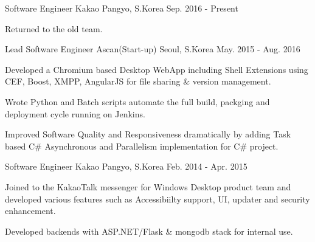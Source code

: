 

\begin{cventries}

  \cventry
    {Software Engineer} %
    {Kakao} %
    {Pangyo, S.Korea} %
    {Sep. 2016 - Present} %
    {
      \begin{cvitems} %
        \item {Returned to the old team. }
      \end{cvitems}
    }


  \cventry
    {Lead Software Engineer} %
    {Ascan(Start-up)} %
    {Seoul, S.Korea} %
    {May. 2015 - Aug. 2016} %
    {
      \begin{cvitems} %
        \item {Developed a Chromium based Desktop WebApp including Shell
    Extensions using CEF, Boost, XMPP, AngularJS for file sharing \& version management.}
        \item {Wrote Python and Batch scripts automate the full build, packging and deployment cycle running on Jenkins.}
        \item {Improved Software Quality and Responsiveness dramatically by adding Task based C\# Asynchronous and Parallelism implementation for C\# project.}
      \end{cvitems}
    }

  \cventry
    {Software Engineer} %
    {Kakao} %
    {Pangyo, S.Korea} %
    {Feb. 2014 - Apr. 2015} %
    {
      \begin{cvitems} %
        \item {Joined to the KakaoTalk messenger for Windows Desktop product team and developed various features such as Accessibiilty support, UI, updater and security enhancement. }
        \item {Developed backends with ASP.NET/Flask \& mongodb stack for internal use.}
      \end{cvitems}
    }


\end{cventries}
